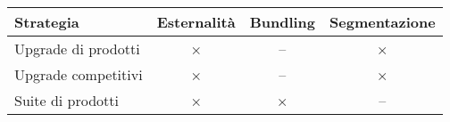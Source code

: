\begin{tabular}{|l|c|c|c|}
\hline
\textbf{Strategia}& \textbf{Esternalità} & \textbf{Bundling} &\textbf{Segmentazione} \\ \hline
Upgrade di prodotti& × & -- & × \\ \hline
Upgrade competitivi & × & -- & ×\\ \hline
Suite di prodotti & × & × & --  \\ \hline
\end{tabular}
